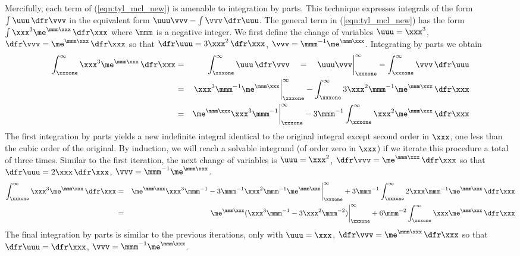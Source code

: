 \documentclass[12pt]{article}
\begin{document}
Mercifully, each term of (\ref{eqn:tyl_mcl_new}) is amenable to integration by parts.
This technique expresses integrals of the form $\int \uuu\,\dfr\vvv$ in the equivalent form $\uuu\vvv - \int \vvv\,\dfr\uuu$.
The general term in (\ref{eqn:tyl_mcl_new}) has the form
$\int \xxx^{3}\me^{\mmm\xxx} \,\dfr\xxx$ where $\mmm$ is a negative integer.
We first define the change of variables $\uuu = \xxx^{3}$, $\dfr\vvv = \me^{\mmm\xxx}\,\dfr\xxx$ so that $\dfr\uuu = 3\xxx^{2}\,\dfr\xxx$, $\vvv = \mmm^{-1}\me^{\mmm\xxx}$.
Integrating by parts we obtain
\begin{eqnarray}
\int_{\xxxone}^{\infty} \xxx^{3}\me^{\mmm\xxx} \,\dfr\xxx  
& = &
\int_{\xxxone}^{\infty} \uuu\,\dfr\vvv \quad = \quad
\uuu\vvv \bigg|_{\xxxone}^{\infty} - \int_{\xxxone}^{\infty} \vvv\,\dfr\uuu \nonumber \\
& = &
\xxx^{3}\mmm^{-1}\me^{\mmm\xxx}\bigg|_{\xxxone}^{\infty} - 
\int_{\xxxone}^{\infty} 3\xxx^{2} \mmm^{-1}\me^{\mmm\xxx} \,\dfr\xxx \nonumber \\
& = &
\me^{\mmm\xxx}\xxx^{3}\mmm^{-1}\bigg|_{\xxxone}^{\infty} - 
3\mmm^{-1} \int_{\xxxone}^{\infty} \xxx^{2}\me^{\mmm\xxx} \,\dfr\xxx
\label{eqn:srs_ntg_itr1}
\end{eqnarray}
The first integration by parts yields a new indefinite integral identical to the original integral except second order in $\xxx$, one less than the cubic order of the original.
By induction, we will reach a solvable integrand (of order zero in $\xxx$) if we iterate this procedure a total of three times.
Similar to the first iteration, the next change of variables is
$\uuu = \xxx^{2}$, $\dfr\vvv = \me^{\mmm\xxx}\,\dfr\xxx$ so that $\dfr\uuu = 2\xxx\,\dfr\xxx$, $\vvv = \mmm^{-1}\me^{\mmm\xxx}$.
\begin{eqnarray}
\int_{\xxxone}^{\infty} \xxx^{3}\me^{\mmm\xxx} \,\dfr\xxx  
& = &
\me^{\mmm\xxx}\xxx^{3}\mmm^{-1} - 3\mmm^{-1}\xxx^{2} \mmm^{-1}\me^{\mmm\xxx} \bigg|_{\xxxone}^{\infty} + 3\mmm^{-1} \int_{\xxxone}^{\infty} 2\xxx\mmm^{-1}\me^{\mmm\xxx} \,\dfr\xxx \nonumber \\
& = &
\me^{\mmm\xxx}(\xxx^{3}\mmm^{-1} - 3\xxx^{2}\mmm^{-2}) \bigg|_{\xxxone}^{\infty} + 6\mmm^{-2} \int_{\xxxone}^{\infty} \xxx\me^{\mmm\xxx} \,\dfr\xxx
\label{eqn:srs_ntg_itr2}
\end{eqnarray}
The final integration by parts is similar to the previous iterations, only with
$\uuu = \xxx$, $\dfr\vvv = \me^{\mmm\xxx}\,\dfr\xxx$ so that $\dfr\uuu = \dfr\xxx$, $\vvv = \mmm^{-1}\me^{\mmm\xxx}$.
\end{document}
